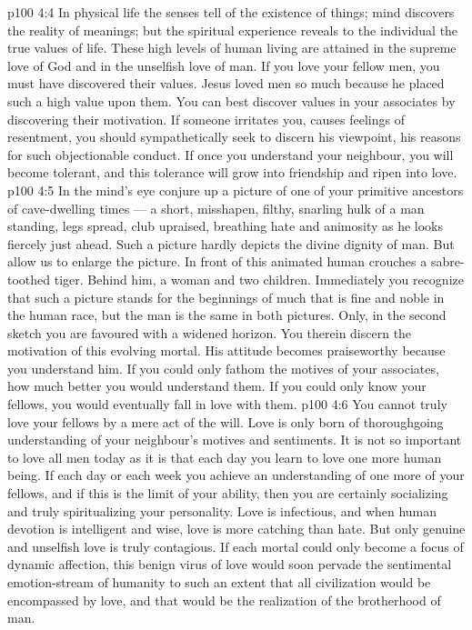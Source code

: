 \vs p100 4:4 \pc In physical life the senses tell of the existence of things; mind discovers the reality of meanings; but the spiritual experience reveals to the individual the true values of life. These high levels of human living are attained in the supreme love of God and in the unselfish love of man. If you love your fellow men, you must have discovered their values. Jesus loved men so much because he placed such a high value upon them. You can best discover values in your associates by discovering their motivation. If someone irritates you, causes feelings of resentment, you should sympathetically seek to discern his viewpoint, his reasons for such objectionable conduct. If once you understand your neighbour, you will become tolerant, and this tolerance will grow into friendship and ripen into love.
\vs p100 4:5 In the mind’s eye conjure up a picture of one of your primitive ancestors of cave\hyp{}dwelling times --- a short, misshapen, filthy, snarling hulk of a man standing, legs spread, club upraised, breathing hate and animosity as he looks fiercely just ahead. Such a picture hardly depicts the divine dignity of man. But allow us to enlarge the picture. In front of this animated human crouches a sabre\hyp{}toothed tiger. Behind him, a woman and two children. Immediately you recognize that such a picture stands for the beginnings of much that is fine and noble in the human race, but the man is the same in both pictures. Only, in the second sketch you are favoured with a widened horizon. You therein discern the motivation of this evolving mortal. His attitude becomes praiseworthy because you understand him. If you could only fathom the motives of your associates, how much better you would understand them. If you could only know your fellows, you would eventually fall in love with them.
\vs p100 4:6 You cannot truly love your fellows by a mere act of the will. Love is only born of thoroughgoing understanding of your neighbour’s motives and sentiments. It is not so important to love all men today as it is that each day you learn to love one more human being. If each day or each week you achieve an understanding of one more of your fellows, and if this is the limit of your ability, then you are certainly socializing and truly spiritualizing your personality. Love is infectious, and when human devotion is intelligent and wise, love is more catching than hate. But only genuine and unselfish love is truly contagious. If each mortal could only become a focus of dynamic affection, this benign virus of love would soon pervade the sentimental emotion\hyp{}stream of humanity to such an extent that all civilization would be encompassed by love, and that would be the realization of the brotherhood of man.
